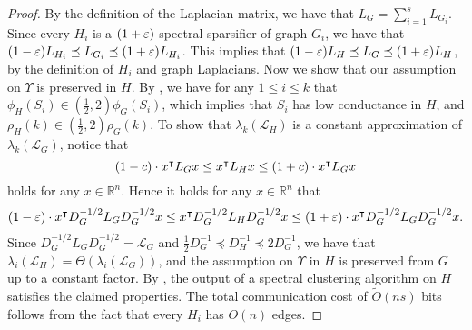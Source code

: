 \begin{proof}
By the definition of the Laplacian matrix, we have that $L_G=\sum_{i=1}^s L_{G_i}$. Since every $H_i$ is a $(1+\varepsilon)$-spectral sparsifier of graph $G_i$,   we have that 
$(1-\varepsilon) L_{H_i}\preceq L_{G_i} \preceq (1+\varepsilon) L_{H_i}$.
This implies that $
(1-\varepsilon) L_{H}\preceq L_{G} \preceq (1+\varepsilon) L_{H}$,
by the definition of $H_i$ and graph Laplacians. 
Now we show that our assumption on $\Upsilon$ is preserved in $H$. By , we have for any $1\leq i \leq k$ that 
$\phi_H(S_i)\in \left(\frac{1}{2},2\right) \phi_G(S_i)$,
which implies that $S_i$ has low conductance in $H$, and $\rho_H(k)\in \left(\frac{1}{2},2\right)\rho_G(k)$. To show that $\lambda_k(\mathcal{L}_H)$ is a constant approximation of $\lambda_k(\mathcal{L}_G)$, notice that \[(1-c)\cdot x^{\intercal} L_Gx \leq x^{\intercal} L_H x \leq (1+c)\cdot x^{\intercal} L_G x\] holds for any $x\in\mathbb{R}^n$. Hence
it holds for any $x\in\mathbb{R}^n$ that 
\[
(1-\varepsilon)\cdot x^{\intercal}D_G^{-1/2} L_GD_G^{-1/2}x \leq x^{\intercal} D_G^{-1/2}L_H D_G^{-1/2}x \leq (1+\varepsilon)\cdot x^{\intercal}D_G^{-1/2} L_GD_G^{-1/2} x.\]
Since $D_G^{-1/2} L_GD_G^{-1/2}=\mathcal{L}_G$ and  $\frac{1}{2} D_G^{-1}\preceq D_H^{-1}\preceq 2 D_G^{-1}$, we have that $\lambda_i\left(\mathcal{L}_H\right)=\Theta\left(\lambda_i\left(\mathcal{L}_G\right)\right)$, and the  assumption on $\Upsilon$ in $H$ is preserved from $G$ up to a constant factor.  By , the output of a spectral clustering algorithm on $H$ satisfies the claimed properties.
The total communication cost of $\tilde{O}(ns)$  bits follows from the fact that every $H_i$ has  $O(n)$ edges.
\end{proof}

